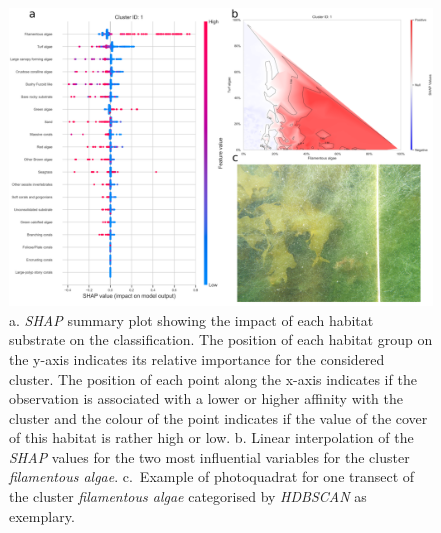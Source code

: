 \begin{figure}
\hypertarget{fig:chap2figS21}{%
\centering
\includegraphics{03-Chapitre2/figures/supplementary/05-explanation_shap_pq_cluster_1.png}
\caption{a. \emph{SHAP} summary plot showing the impact of each habitat
substrate on the classification. The position of each habitat group on
the y-axis indicates its relative importance for the considered cluster.
The position of each point along the x-axis indicates if the observation
is associated with a lower or higher affinity with the cluster and the
colour of the point indicates if the value of the cover of this habitat
is rather high or low. b. Linear interpolation of the \emph{SHAP} values
for the two most influential variables for the cluster \emph{filamentous
algae}. c.~Example of photoquadrat for one transect of the cluster
\emph{filamentous algae} categorised by \emph{HDBSCAN} as
exemplary.}\label{fig:chap2figS21}
}
\end{figure}

